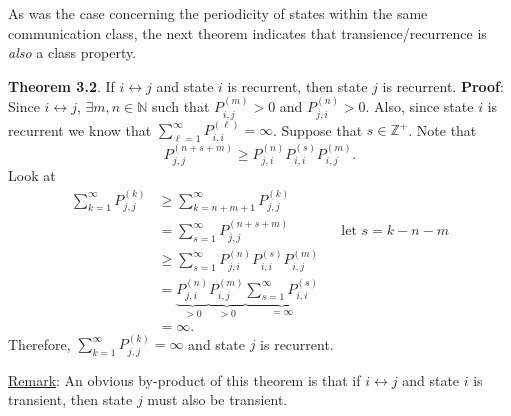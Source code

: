 As was the case concerning the periodicity of states within the same communication class, the
next theorem indicates that transience/recurrence is \emph{also} a class property.
\begin{Result}
    \textbf{Theorem 3.2}. If $ i\leftrightarrow j $ and state $ i $ is recurrent, then state $ j $ is recurrent.
    \tcblower{}
    \textbf{Proof}: Since $ i\leftrightarrow j $, $ \exists m,n\in\mathbb{N} $
    such that $ P_{i,j}^{(m)}>0 $ and $ P_{j,i}^{(n)}>0 $. Also,
    since state $ i $ is recurrent we know that $ \sum_{\ell=1}^{\infty} P_{i,i}^{(\ell)}=\infty $.
    Suppose that $ s\in\mathbb{Z}^+ $. Note that
    \[ P_{j,j}^{(n+s+m)}\ge P_{j,i}^{(n)}P_{i,i}^{(s)}P_{i,j}^{(m)}. \]
    Look at
    \begin{align*}
        \sum_{k=1}^{\infty} P_{j,j}^{(k)}
         & \ge \sum_{k=n+m+1}^{\infty} P_{j,j}^{(k)}                                                                                                         \\
         & =\sum_{s=1}^{\infty} P_{j,j}^{(n+s+m)}                                                                                  &  & \text{let $s=k-n-m$} \\
         & \ge \sum_{s=1}^{\infty} P_{j,i}^{(n)}P_{i,i}^{(s)}P_{i,j}^{(m)}                                                                                   \\
         & =\underbrace{P_{j,i}^{(n)}}_{>0}\underbrace{P_{i,j}^{(m)}}_{>0}\underbrace{\sum_{s=1}^{\infty} P_{i,i}^{(s)}}_{=\infty}                           \\
         & =\infty.
    \end{align*}
    Therefore, $ \sum_{k=1}^{\infty} P_{j,j}^{(k)}=\infty $ and state $ j $
    is recurrent.
\end{Result}
\underline{Remark}: An obvious by-product of this theorem is that if $ i\leftrightarrow j $ and state $ i $ is transient,
then state $ j $ must also be transient.

